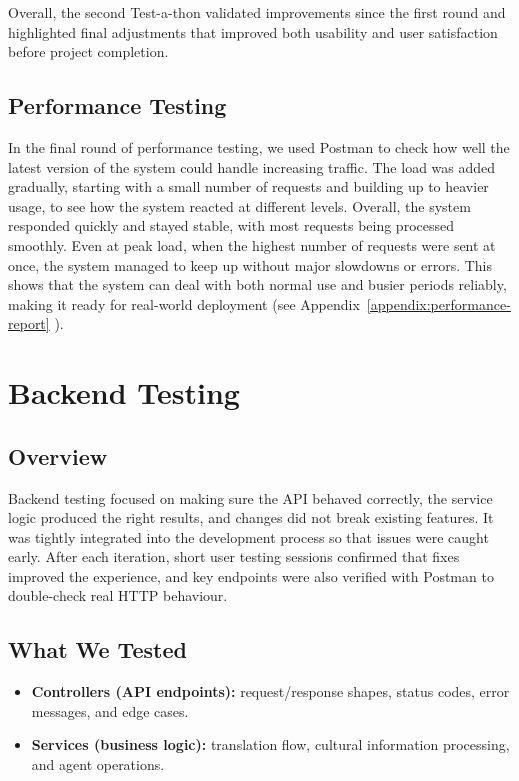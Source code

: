 Overall, the second Test-a-thon validated improvements since the first round and highlighted final adjustments that improved both usability and user satisfaction before project completion.

\subsection{Performance Testing}

In the final round of performance testing, we used Postman to check how well the latest version of the system could handle increasing traffic. The load was added gradually, starting with a small number of requests and building up to heavier usage, to see how the system reacted at different levels. Overall, the system responded quickly and stayed stable, with most requests being processed smoothly. Even at peak load, when the highest number of requests were sent at once, the system managed to keep up without major slowdowns or errors. This shows that the system can deal with both normal use and busier periods reliably, making it ready for real-world deployment (see Appendix~\ref{appendix:performance-report} ).


\section{Backend Testing}
\label{sec:be-testing}

\subsection{Overview}
Backend testing focused on making sure the API behaved correctly, the service logic produced the right results, and changes did not break existing features. 
It was tightly integrated into the development process so that issues were caught early. 
After each iteration, short user testing sessions confirmed that fixes improved the experience, and key endpoints were also verified with Postman to double-check real HTTP behaviour.


\subsection{What We Tested}
\begin{itemize} \itemsep0pt \parskip0pt
    \item \textbf{Controllers (API endpoints):} request/response shapes, status codes, error messages, and edge cases.
    \item \textbf{Services (business logic):} translation flow, cultural information processing, and agent operations.
\end{itemize}

